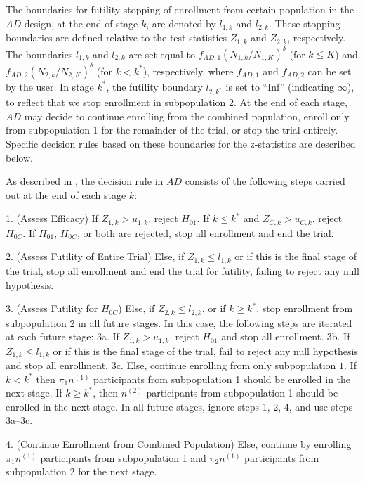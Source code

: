 \documentclass[article]{jss}
\begin{document}
The boundaries for futility stopping of enrollment from certain population in the $AD$ design, at the end of stage $k$, are denoted by $l_{1,k}$ and $l_{2,k}$. These stopping boundaries are defined relative to the test statistics $Z_{1,k}$ and $Z_{2,k}$, respectively. The boundaries $l_{1,k}$ and $l_{2,k}$ are set equal to $f_{AD,1}(N_{1,k}/N_{1,K})^{\delta}$ (for $k\leq K$) and $f_{AD,2}(N_{2,k}/N_{2,K})^{\delta}$ (for $k < k^*$), respectively, where $f_{AD,1}$ and $f_{AD,2}$ can be set by the user.  In stage $k^*$, the futility boundary $l_{2,k^*}$ is set to ``Inf'' (indicating $\infty$), to reflect that we stop enrollment in subpopulation 2. At the end of each stage, $AD$ may decide to continue enrolling from the combined population, enroll only from subpopulation 1 for the remainder of the trial, or stop the trial entirely.  Specific decision rules based on these boundaries for the z-statistics are described below. %


As described in \citep{Rosenblum2013AdaptMISTIE}, the decision rule in $AD$ consists of the following steps carried out at the end of each stage $k$:

\begin{description}
\item 1. (Assess Efficacy) 
 If $Z_{1,k}>u_{1,k}$, reject $H_{01}$.
   If $k\leq k^*$ and  $Z_{C,k} > u_{C,k}$, reject $H_{0C}$. 
 If $H_{01}$, $H_{0C}$, or both  are rejected, stop all enrollment and end the trial.
\item 2. (Assess Futility of Entire Trial) Else, if $Z_{1,k} ≤ l_{1,k}$ or if this is the final stage of the trial, stop all enrollment and end the trial for futility, failing to reject  any null hypothesis.
\item 3. (Assess Futility for $H_{0C}$) Else, if $Z_{2,k} ≤ l_{2,k}$, or if $k\geq k^*$, stop enrollment from subpopulation $2$ in all future stages. In this case, the following steps are iterated at each future stage:
	\subitem  3a. If $Z_{1,k} > u_{1,k}$, reject $H_{01}$ and stop all enrollment.
	\subitem  3b. If $Z_{1,k} ≤ l_{1,k}$ or if this is the final stage of the trial, fail to reject any null hypothesis  and stop all enrollment.
	\subitem  3c. Else, continue enrolling from only subpopulation $1$. If $k < k^*$ then $π_1n^{(1)}$ participants from subpopulation 1 should be enrolled in the next stage. If $k \geq k^*$, then $n^{(2)}$ participants from subpopulation 1 should be enrolled in the next stage. In all future stages, ignore steps 1, 2, 4, and use steps 3a--3c.
\item  4. (Continue Enrollment from Combined Population) Else, continue by enrolling $\pi_1 n^{(1)}$ participants from subpopulation 1 and $\pi_2 n^{(1)}$ participants from subpopulation 2 for the next stage.
\end{description}
\end{document}
